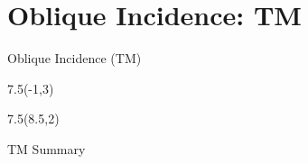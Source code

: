 \section{Oblique Incidence: TM}
\begin{frame}{Oblique Incidence (TM)}
\begin{textblock}{7.5}(-1,3) 
\scalebox{0.75}{
	
}
\end{textblock}


\begin{textblock}{7.5}(8.5,2)
\begin{myblock}[0.95]{TM Summary}
\end{myblock}
\end{textblock}
\end{frame}





